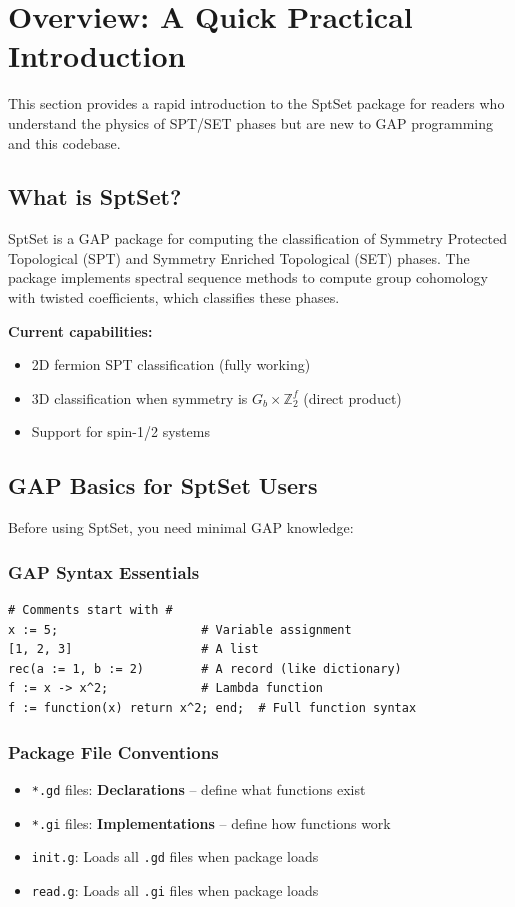 \documentclass{SciPost}
\begin{document}
\section{Overview: A Quick Practical Introduction}
\label{sec:overview}

This section provides a rapid introduction to the SptSet package for readers who understand the physics of SPT/SET phases but are new to GAP programming and this codebase.

\subsection{What is SptSet?}

SptSet is a GAP package for computing the classification of Symmetry Protected Topological (SPT) and Symmetry Enriched Topological (SET) phases. The package implements spectral sequence methods to compute group cohomology with twisted coefficients, which classifies these phases.

\textbf{Current capabilities:}
\begin{itemize}
    \item 2D fermion SPT classification (fully working)
    \item 3D classification when symmetry is $G_b \times \mathbb{Z}_2^f$ (direct product)
    \item Support for spin-1/2 systems
\end{itemize}

\subsection{GAP Basics for SptSet Users}

Before using SptSet, you need minimal GAP knowledge:

\subsubsection{GAP Syntax Essentials}
\begin{verbatim}
# Comments start with #
x := 5;                    # Variable assignment
[1, 2, 3]                  # A list
rec(a := 1, b := 2)        # A record (like dictionary)
f := x -> x^2;             # Lambda function
f := function(x) return x^2; end;  # Full function syntax
\end{verbatim}

\subsubsection{Package File Conventions}
\begin{itemize}
    \item \texttt{*.gd} files: \textbf{Declarations} -- define what functions exist
    \item \texttt{*.gi} files: \textbf{Implementations} -- define how functions work
    \item \texttt{init.g}: Loads all \texttt{.gd} files when package loads
    \item \texttt{read.g}: Loads all \texttt{.gi} files when package loads
\end{itemize}
\end{document}
